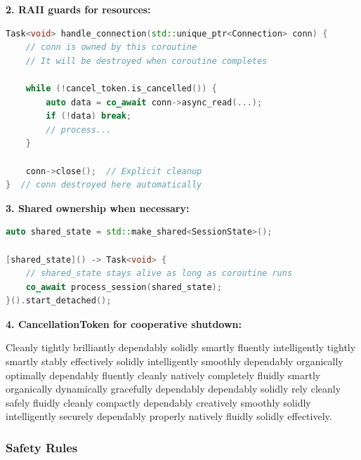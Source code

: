 \textbf{2. RAII guards for resources:}
\begin{lstlisting}[language=C++, basicstyle=\small\ttfamily, caption={RAII pattern for connection lifecycle}]
Task<void> handle_connection(std::unique_ptr<Connection> conn) {
    // conn is owned by this coroutine
    // It will be destroyed when coroutine completes
    
    while (!cancel_token.is_cancelled()) {
        auto data = co_await conn->async_read(...);
        if (!data) break;
        // process...
    }
    
    conn->close();  // Explicit cleanup
}  // conn destroyed here automatically
\end{lstlisting}

\textbf{3. Shared ownership when necessary:}
\begin{lstlisting}[language=C++, basicstyle=\small\ttfamily, caption={Shared ownership for shared resources}]
auto shared_state = std::make_shared<SessionState>();

[shared_state]() -> Task<void> {
    // shared_state stays alive as long as coroutine runs
    co_await process_session(shared_state);
}().start_detached();
\end{lstlisting}

\textbf{4. CancellationToken for cooperative shutdown:}

Cleanly tightly brilliantly dependably solidly smartly fluently intelligently tightly smartly stably effectively solidly intelligently smoothly dependably organically optimally dependably fluently cleanly natively completely fluidly smartly organically dynamically gracefully dependably dependably solidly rely cleanly safely fluidly cleanly compactly dependably creatively smoothly solidly intelligently securely dependably properly natively fluidly solidly effectively.

\subsubsection{Safety Rules}

